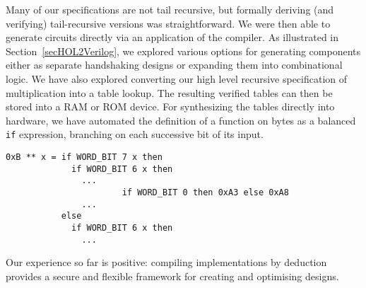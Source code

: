 Many of our specifications are not tail recursive, but formally
deriving (and verifying) tail-recursive versions was
straightforward. We were then able to generate circuits directly via
an application of the compiler.  As illustrated in
Section~\ref{secHOL2Verilog}, we explored various options for
generating components either as separate handshaking designs or expanding
them into combinational logic. We have also explored converting our
high level recursive specification of multiplication into a table
lookup. The resulting verified tables can then be stored into a RAM or
ROM device.  For synthesizing the tables directly into hardware, we
have automated the definition of a function on bytes as a balanced
\texttt{if} expression, branching on each successive bit of its input.

{\footnotesize\begin{verbatim}
0xB ** x = if WORD_BIT 7 x then
             if WORD_BIT 6 x then 
               ...
                       if WORD_BIT 0 then 0xA3 else 0xA8
               ...
           else
             if WORD_BIT 6 x then
               ...
\end{verbatim}}

Our experience so far is positive: compiling implementations by
deduction provides a secure and flexible framework for creating and
optimising designs.





